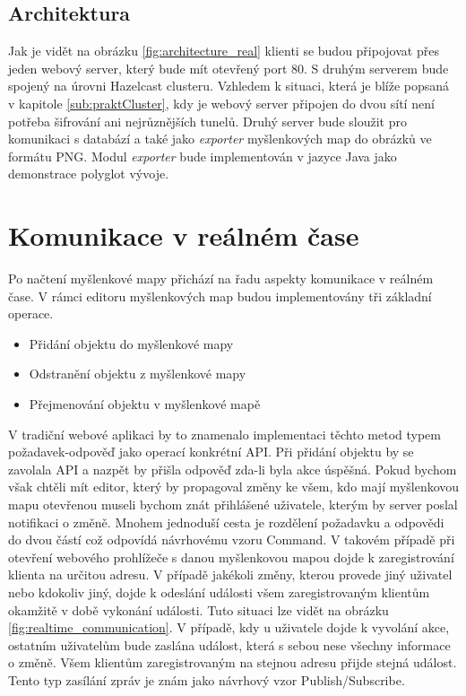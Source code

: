 
\subsection{Architektura}

Jak je vidět na obrázku \ref{fig:architecture_real} klienti se budou připojovat přes jeden webový server, který bude mít otevřený port 80. S druhým serverem bude spojený na úrovni Hazelcast clusteru. Vzhledem k situaci, která je blíže popsaná v kapitole \ref{sub:praktCluster}, kdy je webový server připojen do dvou sítí není potřeba šifrování ani nejrůznějších tunelů. Druhý server bude sloužit pro komunikaci s databází a také jako \emph{exporter} myšlenkových map do obrázků ve formátu PNG. Modul \emph{exporter} bude implementován v jazyce Java jako demonstrace polyglot vývoje.


\section{Komunikace v reálném čase}\label{sec:realTimeCommunication}

Po načtení myšlenkové mapy přichází na řadu aspekty komunikace v reálném čase. V rámci editoru myšlenkových map budou implementovány tři základní operace.
\begin{itemize}
\item Přidání objektu do myšlenkové mapy
\item Odstranění objektu z myšlenkové mapy
\item Přejmenování objektu v myšlenkové mapě
\end{itemize}
V tradiční webové aplikaci by to znamenalo implementaci těchto metod typem požadavek-odpověď jako operací konkrétní API. Při přidání objektu by se zavolala API a nazpět by přišla odpověď zda-li byla akce úspěšná. Pokud bychom však chtěli mít editor, který by propagoval změny ke všem, kdo mají myšlenkovou mapu otevřenou museli bychom znát přihlášené uživatele, kterým by server poslal notifikaci o změně. Mnohem jednoduší cesta je rozdělení požadavku a odpovědi do dvou částí což odpovídá návrhovému vzoru Command. V takovém případě při otevření webového prohlížeče s danou myšlenkovou mapou dojde k zaregistrování klienta na určitou adresu. V případě jakékoli změny, kterou provede jiný uživatel nebo kdokoliv jiný, dojde k odeslání události všem zaregistrovaným klientům okamžitě v době vykonání události. Tuto situaci lze vidět na obrázku \ref{fig:realtime_communication}. V případě, kdy u uživatele dojde k vyvolání akce, ostatním uživatelům bude zaslána událost, která s sebou nese všechny informace o změně. Všem klientům zaregistrovaným na stejnou adresu přijde stejná událost. Tento typ zasílání zpráv je znám jako návrhový vzor Publish/Subscribe.

